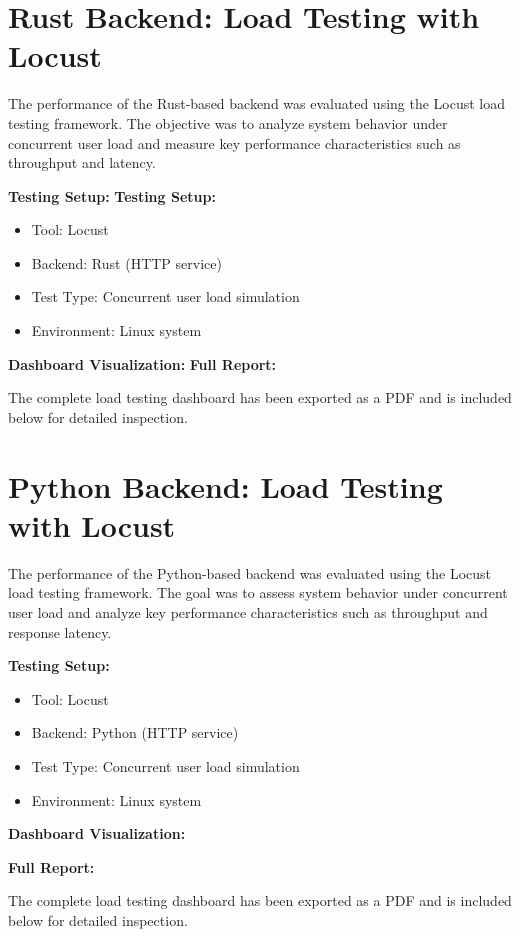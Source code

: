 \documentclass[11pt,a4paper]{article}
\begin{document}
\section{Rust Backend: Load Testing with Locust}

The performance of the Rust-based backend was evaluated using the Locust load testing framework. The objective was to analyze system behavior under concurrent user load and measure key performance characteristics such as throughput and latency.

\textbf{Testing Setup:}
\textbf{Testing Setup:}
\begin{itemize}
    \item Tool: Locust
    \item Backend: Rust (HTTP service)
    \item Test Type: Concurrent user load simulation
    \item Environment: Linux system
\end{itemize}

\textbf{Dashboard Visualization:}
\textbf{Full Report:}

The complete load testing dashboard has been exported as a PDF and is included below for detailed inspection.




\section{Python Backend: Load Testing with Locust}

The performance of the Python-based backend was evaluated using the Locust load testing framework. The goal was to assess system behavior under concurrent user load and analyze key performance characteristics such as throughput and response latency.

\textbf{Testing Setup:}
\begin{itemize}
    \item Tool: Locust
    \item Backend: Python (HTTP service)
    \item Test Type: Concurrent user load simulation
    \item Environment: Linux system
\end{itemize}

\textbf{Dashboard Visualization:}

\textbf{Full Report:}

The complete load testing dashboard has been exported as a PDF and is included below for detailed inspection.
\end{document}
